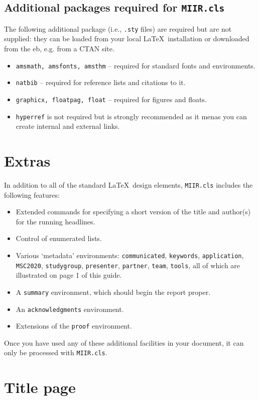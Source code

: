 \documentclass{MIIR}
\theoremstyle{plain}
\theoremstyle{definition}
\begin{document}
\subsection{Additional packages required for \texttt{MIIR.cls}}
\label{sec:adpkg}
The following additional package (i.e., \verb".sty" files) are required but are not supplied: they can
be loaded from your local \LaTeX\ installation or downloaded from the eb, e.g. from a CTAN site.

\begin{itemize}
    \item \verb"amsmath, amsfonts, amsthm" -- required for standard fonts and environments.
    \item \verb"natbib" -- required for reference lists and citations to it.
    \item \verb"graphicx, floatpag, float" -- required for figures and floats.
    \item \verb"hyperref" is not required but is strongly recommended as it menas you can create internal and external links.
\end{itemize}


\section{Extras}

In addition to all of the standard \LaTeX\ design elements, \verb"MIIR.cls"  
includes the following features:
\begin{itemize}
  \item Extended commands for specifying a short version
        of the title and author(s) for the running
        headlines.
  \item Control of enumerated lists.
  \item Various `metadata' environments: {\tt communicated}, {\tt keywords}, {\tt application}, {\tt MSC2020}, {\tt studygroup}, {\tt presenter}, {\tt partner}, {\tt team}, {\tt tools}, all of which are illustrated on page 1 of this guide.
  \item A {\tt summary} environment, which should begin the report proper.
  \item An {\tt acknowledgments} environment.
  \item Extensions of the {\tt proof} environment.
\end{itemize}
Once you have used any of these additional facilities in your document,
it can only be processed with \verb"MIIR.cls".

\section{Title page}
\end{document}
